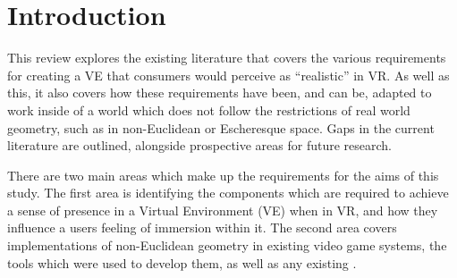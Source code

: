 \section{Introduction}
\label{lr:intro}

	This review explores the existing literature that covers the various requirements for creating a VE that consumers would perceive as \enquote{realistic} in VR.
	As well as this, it also covers how these requirements have been, and can be, adapted to work inside of a world which does not follow the restrictions of real world geometry, such as in non-Euclidean or Escheresque space.
	Gaps in the current literature are outlined, alongside prospective areas for future research.

	There are two main areas which make up the requirements for the aims of this study.
	The first area is identifying the components which are required to achieve a sense of presence in a Virtual Environment (VE) when in VR, and how they influence a users feeling of immersion within it.
	The second area covers implementations of non-Euclidean geometry in existing video game systems, the tools which were used to develop them, as well as any existing .
